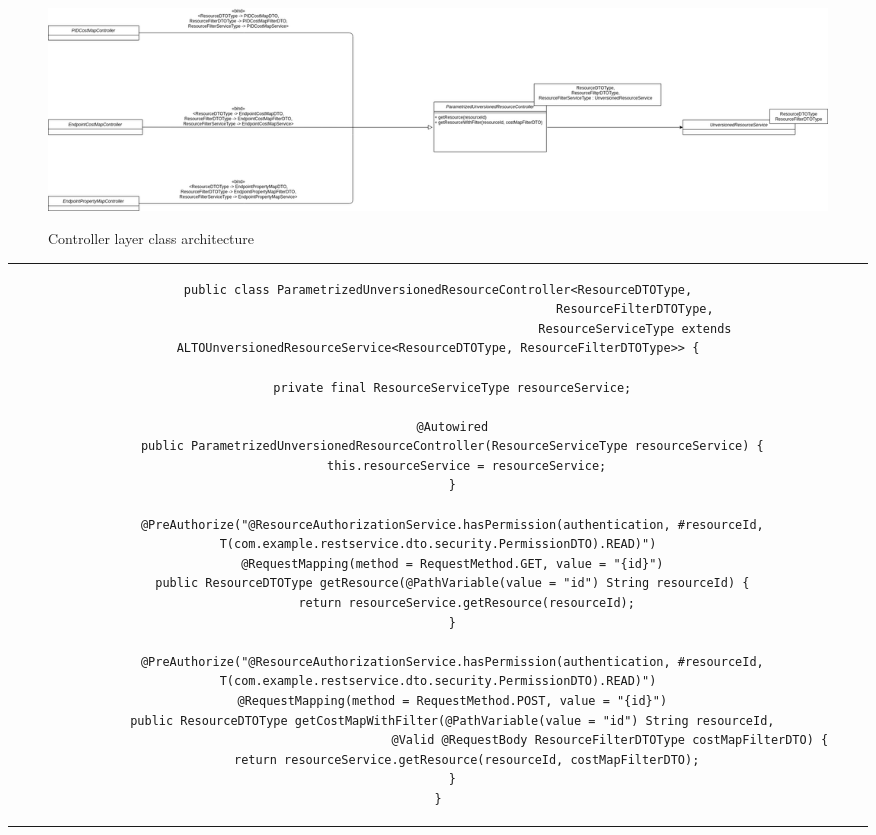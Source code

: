 \begin{figure}[ht]
\centering
\includegraphics[scale=0.2]{img/controller-unversioned-architecture.png}
\label{fig:controller-unversioned-architecture}
\caption{Controller layer class architecture}
\end{figure}

\begin{center}
\begin{tabular}{c}
\begin{lstlisting}[caption=Parametrized Controller class for unversioned resources, label={lst:generic-unversioned-controller}]
public class ParametrizedUnversionedResourceController<ResourceDTOType,
                                                       ResourceFilterDTOType,
                                                       ResourceServiceType extends ALTOUnversionedResourceService<ResourceDTOType, ResourceFilterDTOType>> {

    private final ResourceServiceType resourceService;

    @Autowired
    public ParametrizedUnversionedResourceController(ResourceServiceType resourceService) {
        this.resourceService = resourceService;
    }

    @PreAuthorize("@ResourceAuthorizationService.hasPermission(authentication, #resourceId, T(com.example.restservice.dto.security.PermissionDTO).READ)")
    @RequestMapping(method = RequestMethod.GET, value = "{id}")
    public ResourceDTOType getResource(@PathVariable(value = "id") String resourceId) {
        return resourceService.getResource(resourceId);
    }

    @PreAuthorize("@ResourceAuthorizationService.hasPermission(authentication, #resourceId, T(com.example.restservice.dto.security.PermissionDTO).READ)")
    @RequestMapping(method = RequestMethod.POST, value = "{id}")
    public ResourceDTOType getCostMapWithFilter(@PathVariable(value = "id") String resourceId,
                                                @Valid @RequestBody ResourceFilterDTOType costMapFilterDTO) {
        return resourceService.getResource(resourceId, costMapFilterDTO);
    }
}

\end{lstlisting}
\end{tabular}
\end{center}

